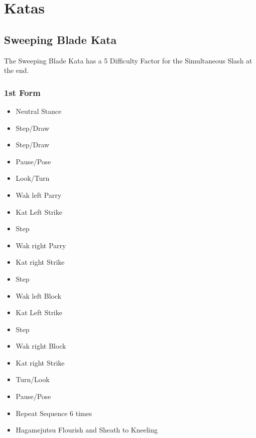 \documentclass[10pt]{report}
\begin{document}
\chapter{Katas}
\section{Sweeping Blade Kata}
The Sweeping Blade Kata has a 5 Difficulty Factor
for the Simultaneous Slash at the end.

\twocolumn
\subsection{1st Form}
\begin{itemize}
         \item Neutral Stance
         \item Step/Draw
         \item Step/Draw
         \item Pause/Pose
         \item Look/Turn
         \item Wak left Parry
         \item Kat Left Strike
         \item Step
         \item Wak right Parry
         \item Kat right Strike
         \item Step
         \item Wak left Block
         \item Kat Left Strike
         \item Step
         \item Wak right Block
         \item Kat right Strike
         \item Turn/Look
         \item Pause/Pose
         \item Repeat Sequence 6 times
         \item Hagamejutsu Flourish and Sheath to Kneeling
\end{itemize}
\end{document}
